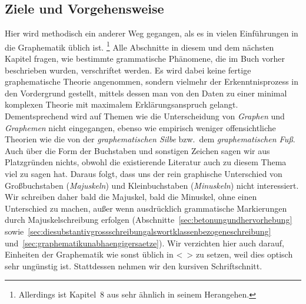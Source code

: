\subsection{Ziele und Vorgehensweise}
\label{sec:zieleundvorgehensweise}

Hier wird methodisch ein anderer Weg gegangen, als es in vielen Einführungen in die Graphematik üblich ist.%
\footnote{Allerdings ist Kapitel~8 aus \citet{Eisenberg2013a} sehr ähnlich in seinem Herangehen.}
Alle Abschnitte in diesem und dem nächsten Kapitel fragen, wie bestimmte grammatische Phänomene, die im Buch vorher beschrieben wurden, verschriftet werden.
Es wird dabei keine fertige graphematische Theorie angenommen, sondern vielmehr der Erkenntnisprozess in den Vordergrund gestellt, mittels dessen man von den Daten zu einer minimal komplexen Theorie mit maximalem Erklärungsanspruch gelangt.
Dementsprechend wird auf Themen wie \zB die Unterscheidung von \textit{Graphen} und \textit{Graphemen} nicht eingegangen, ebenso wie empirisch weniger offensichtliche Theorien wie die von der \textit{graphematischen Silbe} bzw.\ dem \textit{graphematischen Fuß}.
Auch über die Form der Buchstaben und sonstigen Zeichen sagen wir aus Platzgründen nichts, obwohl die existierende Literatur auch zu diesem Thema viel zu sagen hat.
Daraus folgt, dass uns der rein graphische Unterschied von Großbuchstaben (\textit{Majuskeln}) und Kleinbuchstaben (\textit{Minuskeln}) nicht interessiert.
Wir schreiben daher bald die Majuskel, bald die Minuskel, ohne einen Unterschied zu machen, außer wenn ausdrücklich grammatische Markierungen durch Majuskelschreibung erfolgen (Abschnitte~\ref{sec:betonungundhervorhebung} sowie~\ref{sec:diesubstantivgrossschreibungalswortklassenbezogeneschreibung} und~\ref{sec:graphematikunabhaengigersaetze}).
Wir verzichten hier auch darauf, Einheiten der Graphematik wie sonst üblich in <~> zu setzen, weil dies optisch sehr ungünstig ist.
Stattdessen nehmen wir den kursiven Schriftschnitt.

